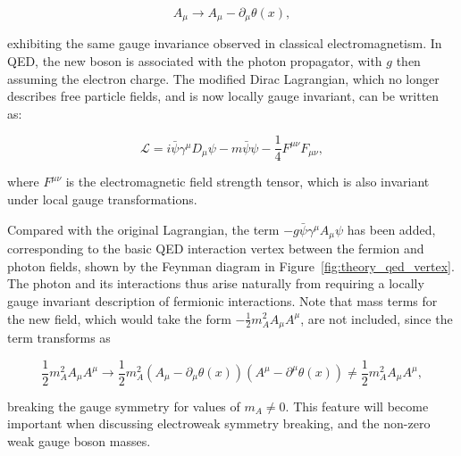 \begin{equation}
    A_{\mu} \rightarrow A_{\mu} - \partial_{\mu}\theta(x),
\end{equation}

\noindent exhibiting the same gauge invariance observed in classical electromagnetism. In QED, the new boson is associated with the photon propagator, with ${g}$ then assuming the electron charge. The modified Dirac Lagrangian, which no longer describes free particle fields, and is now locally gauge invariant, can be written as:

\begin{equation}
    \mathcal{L} = i\bar{\psi}\gamma^{\mu}D_{\mu}\psi - m\bar{\psi}\psi - \frac{1}{4}F^{\mu\nu}F_{\mu\nu},
\end{equation}

\noindent where ${F^{\mu\nu}}$ is the electromagnetic field strength tensor, which is also invariant under local gauge transformations. %

Compared with the original Lagrangian, the term ${-g\bar{\psi}\gamma^{\mu}A_\mu\psi}$ has been added, corresponding to the basic QED interaction vertex between the fermion and photon fields, shown by the Feynman diagram in Figure~\ref{fig:theory_qed_vertex}. The photon and its interactions thus arise naturally from requiring a locally gauge invariant description of fermionic interactions. Note that mass terms for the new field, which would take the form ${-\frac{1}{2}m_{A}^{2}A_{\mu}A^{\mu}}$, are not included, since the term transforms as 

\begin{equation}
    \frac{1}{2}m_{A}^{2}A_{\mu}A^{\mu} \rightarrow \frac{1}{2}m_{A}^{2}\left(A_{\mu} - \partial_{\mu}\theta(x)\right)\left(A^{\mu} - \partial^{\mu}\theta(x)\right) \neq \frac{1}{2}m_{A}^{2}A_{\mu}A^{\mu},
\end{equation}

\noindent breaking the gauge symmetry for values of ${m_{A}\neq 0}$. This feature will become important when discussing electroweak symmetry breaking, and the non-zero weak gauge boson masses. 


